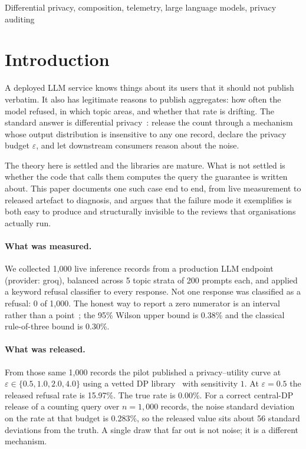 \documentclass[journal]{IEEEtran}
\theoremstyle{definition}
\newcommand{\Nrec}{1{,}000}
\newcommand{\Ntopics}{5}
\newcommand{\Nper}{200}
\newcommand{\Nrefused}{0}
\newcommand{\Truerate}{0.00}
\newcommand{\WilsonUp}{0.38}
\newcommand{\RuleThree}{0.30}
\newcommand{\Provider}{groq}
\newcommand{\WorstEps}{0.5}
\newcommand{\WorstRelease}{15.97}
\newcommand{\WorstErrSD}{56}
\newcommand{\LapSDtheoryhalf}{0.283}
\begin{document}
\begin{IEEEkeywords}
Differential privacy, composition, telemetry, large language models, privacy auditing
\end{IEEEkeywords}

\section{Introduction}
\label{sec:intro}

A deployed LLM service knows things about its users that it should not publish
verbatim. It also has legitimate reasons to publish aggregates: how often the
model refused, in which topic areas, and whether that rate is drifting. The
standard answer is differential privacy~\cite{dwork2006calibrating,
dwork2014algorithmic}: release the count through a mechanism whose output
distribution is insensitive to any one record, declare the privacy budget
$\varepsilon$, and let downstream consumers reason about the noise.

The theory here is settled and the libraries are mature. What is not settled is
whether the code that calls them computes the query the guarantee is written
about. This paper documents one such case end to end, from live measurement to
released artefact to diagnosis, and argues that the failure mode it exemplifies
is both easy to produce and structurally invisible to the reviews that
organisations actually run.

\paragraph{What was measured.}
We collected \Nrec{} live inference records from a production LLM endpoint
(provider: \Provider), balanced across \Ntopics{} topic strata of \Nper{} prompts
each, and applied a keyword refusal classifier to every response. Not one
response was classified as a refusal: \Nrefused{} of \Nrec{}. The honest way to
report a zero numerator is an interval rather than a point~\cite{hanley1983zero,
wilson1927interval}; the 95\% Wilson upper bound is \WilsonUp\% and the classical
rule-of-three bound is \RuleThree\%.

\paragraph{What was released.}
From those same \Nrec{} records the pilot published a privacy--utility curve at
$\varepsilon \in \{0.5, 1.0, 2.0, 4.0\}$ using a vetted DP
library~\cite{holohan2019diffprivlib} with sensitivity $1$. At
$\varepsilon=\WorstEps$ the released refusal rate is \WorstRelease\%. The true
rate is \Truerate\%. For a correct central-DP release of a counting query over
$n=\Nrec{}$ records, the noise standard deviation on the rate at that budget is
\LapSDtheoryhalf\%, so the released value sits about \WorstErrSD{} standard
deviations from the truth. A single draw that far out is not noise; it is a
different mechanism.
\end{document}
